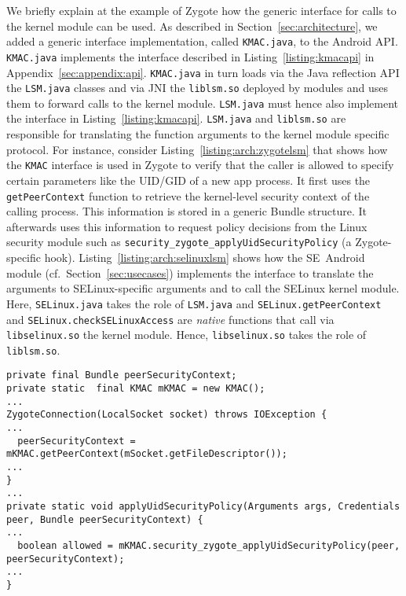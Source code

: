 \documentclass[letterpaper,twocolumn,10pt]{article}
\begin{document}
We briefly explain at the example of Zygote how the generic interface for calls to the kernel module can be used. As described in Section~\ref{sec:architecture}, we added a generic interface implementation, called \texttt{KMAC.java}, to the Android API. \texttt{KMAC.java} implements the interface described in Listing~\ref{listing:kmacapi} in Appendix~\ref{sec:appendix:api}. \texttt{KMAC.java} in turn loads via the Java reflection API the \texttt{LSM.java} classes and via JNI the \texttt{liblsm.so} deployed by modules and uses them to forward calls to the kernel module. \texttt{LSM.java} must hence also implement the interface in Listing~\ref{listing:kmacapi}. \texttt{LSM.java} and \texttt{liblsm.so} are responsible for translating the function arguments to the kernel module specific protocol. For instance, consider Listing~\ref{listing:arch:zygotelsm} that shows how the \texttt{KMAC} interface is used in Zygote to verify that the caller is allowed to specify certain parameters like the UID/GID of a new app process. It first uses the \texttt{getPeerContext} function to retrieve the kernel-level security context of the calling process. This information is stored in a generic Bundle structure. It afterwards uses this information to request policy decisions from the Linux security module such as \texttt{security\_zygote\_applyUidSecurityPolicy} (a Zygote-specific hook). Listing~\ref{listing:arch:selinuxlsm} shows how the SE~Android module (cf.~Section~\ref{sec:usecases}) implements the interface to translate the arguments to SELinux-specific arguments and to call the SELinux kernel module. Here, \texttt{SELinux.java} takes the role of \texttt{LSM.java} and \texttt{SELinux.getPeerContext} and \texttt{SELinux.checkSELinuxAccess} are \textit{native} functions that call via \texttt{libselinux.so} the kernel module. Hence, \texttt{libselinux.so} takes the role of \texttt{liblsm.so}.

\begin{lstlisting}[basicstyle=\footnotesize, caption={Use of generic Kernel module interface in \texttt{ZygoteConnection.java}}, label={listing:arch:zygotelsm},aboveskip=\medskipamount]
private final Bundle peerSecurityContext;
private static  final KMAC mKMAC = new KMAC();
...
ZygoteConnection(LocalSocket socket) throws IOException {
...
  peerSecurityContext = mKMAC.getPeerContext(mSocket.getFileDescriptor());
...
}
...
private static void applyUidSecurityPolicy(Arguments args, Credentials peer, Bundle peerSecurityContext) {
...
  boolean allowed = mKMAC.security_zygote_applyUidSecurityPolicy(peer, peerSecurityContext);
...
}
\end{lstlisting}
\end{document}
